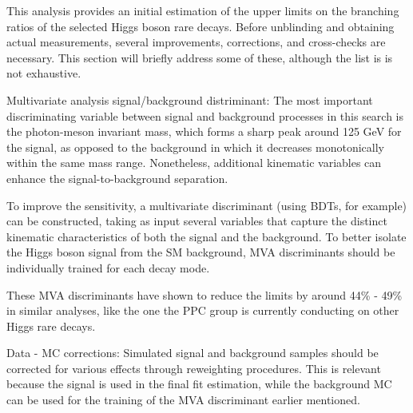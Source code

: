 This analysis provides an initial estimation of the upper limits on the branching ratios of the selected Higgs boson rare decays. Before unblinding and obtaining actual measurements, several improvements, corrections, and cross-checks are necessary. This section will briefly address some of these, although the list is is not exhaustive.
\vspace*{-6pt}
\begin{myitemlist}
    \item[Multivariate analysis signal/background distriminant:] The most important discriminating variable between signal and background processes in this search is the photon-meson invariant mass, which forms a sharp peak around 125 GeV for the signal, as opposed to the background in which it decreases monotonically within the same mass range. Nonetheless, additional kinematic variables can enhance the signal-to-background separation.
    
    To improve the sensitivity, a multivariate discriminant (using BDTs, for example) can be constructed, taking as input several variables that capture the distinct kinematic characteristics of both the signal and the background. To better isolate the Higgs boson signal from the SM background, MVA discriminants should be individually trained for each decay mode.

    These MVA discriminants have shown to reduce the limits by around 44\% - 49\% in similar analyses, like the one the PPC group is currently conducting on other Higgs rare decays.

    \item[Data - MC corrections:] Simulated signal and background samples should be corrected for various effects through reweighting procedures. This is relevant because the signal is used in the final fit estimation, while the background MC can be used for the training of the MVA discriminant earlier mentioned. 
\iffalse
\end{myitemlist}
